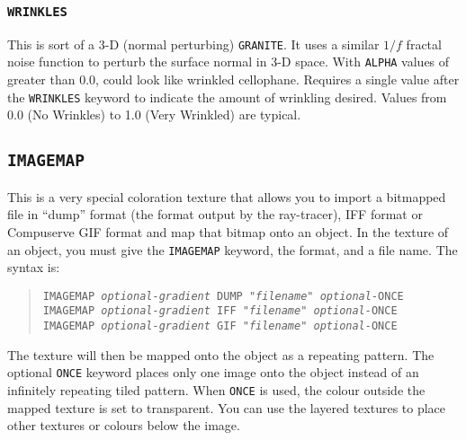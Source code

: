 \subsubsection{{\tt WRINKLES}}

This is sort of a 3-D (normal perturbing) {\tt GRANITE}.
It uses a
similar $1/f$ fractal noise function to perturb the surface normal in
3-D space.  With {\tt ALPHA} values of greater than
0.0, could look
like wrinkled cellophane.  Requires a single value after the
{\tt WRINKLES} keyword to indicate the amount of wrinkling desired.  Values
from 0.0 (No Wrinkles) to 1.0 (Very Wrinkled) are typical.

\subsection{{\tt IMAGEMAP}}

This is a very special coloration texture that allows you to import a
bitmapped file in ``dump'' format (the format output by the ray-tracer),
IFF format or Compuserve GIF format and map that
bitmap onto an object.  In the texture of an object, you must give the
{\tt IMAGEMAP} keyword, the format, and a file name.  The syntax is:
\begin{verse}
{\tt IMAGEMAP {\em optional-gradient} DUMP "{\em filename\/}" {\em optional-}ONCE} \\
{\tt IMAGEMAP {\em optional-gradient} IFF "{\em filename\/}" {\em optional-}ONCE} \\
{\tt IMAGEMAP {\em optional-gradient} GIF "{\em filename\/}" {\em optional-}ONCE}
\end{verse}
The texture will then be mapped onto the object as a repeating
pattern.  The optional
{\tt ONCE} keyword
places only one image onto the object
instead of an infinitely repeating tiled pattern.  When {\tt ONCE} is
used, the colour outside the mapped texture is set to transparent.
You can use the layered textures to place other textures or colours
below the image.

